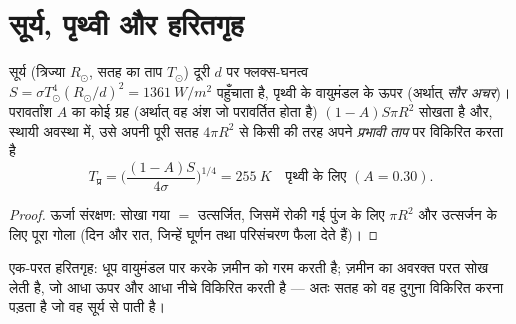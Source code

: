\section{सूर्य, पृथ्वी और हरितगृह}

\begin{proposition}[सौर अचर और प्रभावी ताप]\label{prop:b2:thermal-radiation:earth}
सूर्य (त्रिज्या $R_\odot$, सतह का ताप $T_\odot$) दूरी $d$ पर
फ्लक्स-घनत्व $S = \sigma T_\odot^4 (R_\odot/d)^2 =
\qty{1361}{W/m^2}$ पहुँचाता है, पृथ्वी के वायुमंडल के ऊपर (अर्थात् \emph{सौर
अचर})। परावर्तांश $A$ का कोई ग्रह (अर्थात् वह अंश जो
परावर्तित होता है) $(1 - A)S\pi R^2$ सोखता है और, स्थायी अवस्था में, उसे
अपनी पूरी सतह $4\pi R^2$ से किसी  की तरह अपने \emph{प्रभावी
ताप} पर विकिरित करता है
\[
T_{\text{प्र}} = \Big(\frac{(1 - A)S}{4\sigma}\Big)^{1/4} = \qty{255}{K}
\quad\text{पृथ्वी के लिए } (A = 0.30) .
\]
\end{proposition}

\begin{proof}
ऊर्जा संरक्षण: सोखा गया $=$ उत्सर्जित, जिसमें रोकी गई पुंज के लिए 
$\pi R^2$ और उत्सर्जन के लिए पूरा गोला (दिन और
रात, जिन्हें घूर्णन तथा परिसंचरण फैला देते हैं)।
\end{proof}

\begin{omfigure}

{\small एक-परत हरितगृह: धूप वायुमंडल पार करके
ज़मीन को गरम करती है; ज़मीन का अवरक्त परत सोख लेती है, जो
आधा ऊपर और आधा नीचे विकिरित करती है --- अतः सतह को वह दुगुना विकिरित करना पड़ता है
जो वह सूर्य से पाती है।}
\end{omfigure}


